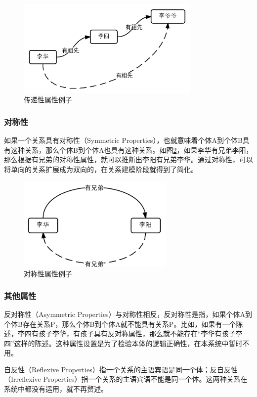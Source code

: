 \documentclass[12pt,a4paper]{article}
\begin{document}
	\begin{figure}[htbp] 
	\centering\includegraphics[width=3.5in]{fig/transitivePropertyExample.png} 
	\caption{传递性属性例子}\label{fig:传递性属性例子} 
	\end{figure}	
	
		\subsubsection{对称性}
	如果一个关系具有对称性（Symmetric Properties），也就意味着个体A到个体B具有这种关系，那么个体B到个体A也具有这种关系。如图\ref{fig:对称性属性例子}，如果李华有兄弟李阳，那么根据有兄弟的对称性属性，就可以推断出李阳有兄弟李华。通过对称性，可以将单向的关系扩展成为双向的，在关系建模阶段就得到了简化。
	\begin{figure}[htbp] 
	\centering\includegraphics[width=3in]{fig/SymmetricPropertyExample.png} 
	\caption{对称性属性例子}\label{fig:对称性属性例子} 
	\end{figure}	
	
		\subsubsection{其他属性}
	反对称性（Asymmetric Properties）与对称性相反，反对称性是指，如果个体A到个体B存在关系P，那么个体B到个体A就不能具有关系P。比如，如果有一个陈述，李四有孩子李华，有孩子具有反对称属性，那么就不能存在“李华有孩子李四”这样的陈述。这种属性设置是为了检验本体的逻辑正确性，在本系统中暂时不用。
	
	自反性（Reflexive Properties）指一个关系的主语宾语是同一个体；反自反性（Irreflexive Properties）指一个关系的主语宾语不能是同一个体。这两种关系在系统中都没有运用，就不再赘述。
	
\end{document}
